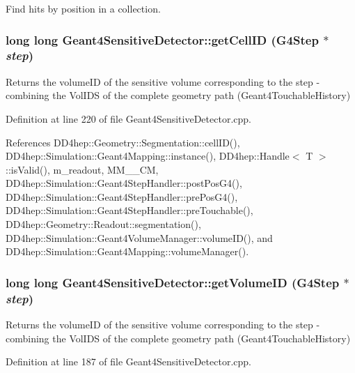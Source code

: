 Find hits by position in a collection. \hypertarget{class_d_d4hep_1_1_simulation_1_1_geant4_sensitive_detector_a02a92ee533ee2067bc629f7a8b123c89}{
\subsubsection[{getCellID}]{\setlength{\rightskip}{0pt plus 5cm}long long Geant4SensitiveDetector::getCellID (G4Step $\ast$ {\em step})}}
\label{class_d_d4hep_1_1_simulation_1_1_geant4_sensitive_detector_a02a92ee533ee2067bc629f7a8b123c89}
Returns the volumeID of the sensitive volume corresponding to the step -\/ combining the VolIDS of the complete geometry path (Geant4TouchableHistory) 

Definition at line 220 of file Geant4SensitiveDetector.cpp.

References DD4hep::Geometry::Segmentation::cellID(), DD4hep::Simulation::Geant4Mapping::instance(), DD4hep::Handle$<$ T $>$::isValid(), m\_\-readout, MM\_\_\-CM, DD4hep::Simulation::Geant4StepHandler::postPosG4(), DD4hep::Simulation::Geant4StepHandler::prePosG4(), DD4hep::Simulation::Geant4StepHandler::preTouchable(), DD4hep::Geometry::Readout::segmentation(), DD4hep::Simulation::Geant4VolumeManager::volumeID(), and DD4hep::Simulation::Geant4Mapping::volumeManager().\hypertarget{class_d_d4hep_1_1_simulation_1_1_geant4_sensitive_detector_adb27c3e691e051044fbf1bd06cd70cac}{
\subsubsection[{getVolumeID}]{\setlength{\rightskip}{0pt plus 5cm}long long Geant4SensitiveDetector::getVolumeID (G4Step $\ast$ {\em step})}}
\label{class_d_d4hep_1_1_simulation_1_1_geant4_sensitive_detector_adb27c3e691e051044fbf1bd06cd70cac}
Returns the volumeID of the sensitive volume corresponding to the step -\/ combining the VolIDS of the complete geometry path (Geant4TouchableHistory) 

Definition at line 187 of file Geant4SensitiveDetector.cpp.

